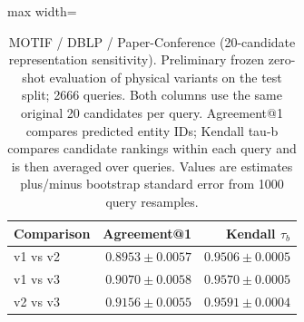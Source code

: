 \begin{table}[htbp]
\centering
\small
\begin{adjustbox}{max width=\linewidth}
\begin{tabular}{lrr}
\toprule
Comparison & Agreement@1 & Kendall $\tau_b$ \\
\midrule
v1 vs v2 & $0.8953 \pm 0.0057$ & $0.9506 \pm 0.0005$ \\
v1 vs v3 & $0.9070 \pm 0.0058$ & $0.9570 \pm 0.0005$ \\
v2 vs v3 & $0.9156 \pm 0.0055$ & $0.9591 \pm 0.0004$ \\
\bottomrule
\end{tabular}
\end{adjustbox}
\caption{MOTIF / DBLP / Paper-Conference (20-candidate representation sensitivity). Preliminary frozen zero-shot evaluation of physical variants on the test split; 2666 queries. Both columns use the same original 20 candidates per query. Agreement@1 compares predicted entity IDs; Kendall tau-b compares candidate rankings within each query and is then averaged over queries. Values are estimates plus/minus bootstrap standard error from 1000 query resamples.}
\label{tab:motif-dblp-paper-conference-invariance}
\end{table}
